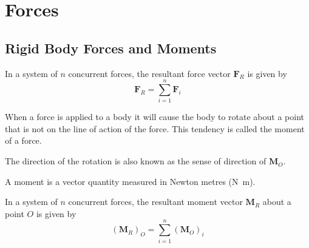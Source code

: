 \documentclass{article}
\begin{document}
\section{Forces}
\subsection{Rigid Body Forces and Moments}
\begin{definition}
    In a system of \(n\) concurrent forces, the resultant force vector \(\symbf{F}_R\) is given by
    \begin{equation*}
        \symbf{F}_R = \sum_{i = 1}^n \symbf{F}_i
    \end{equation*}
\end{definition}
\begin{definition}[Moment]
    When a force is applied to a body it will cause the body to
    rotate about a point that is not on the line of action of the force.
    This tendency is called the moment of a force.

    The direction of the rotation is also known as the sense of direction of \(\symbf{M}_O\).

    A moment is a vector quantity measured in Newton metres (\unit{N.m}).
\end{definition}
\begin{definition}
    In a system of \(n\) concurrent forces, the resultant moment vector \(\symbf{M}_R\) about a point \(O\) is given by
    \begin{equation*}
        \left( \symbf{M}_R \right)_{O} = \sum_{i = 1}^n \left( \symbf{M}_O \right)_i
    \end{equation*}
\end{definition}
\end{document}
